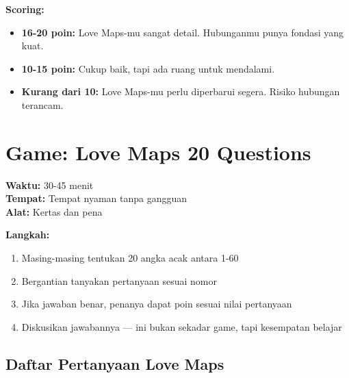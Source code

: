 \begin{exercisebox}
\textbf{Scoring:}
\begin{itemize}
    \item \textbf{16-20 poin:} Love Maps-mu sangat detail. Hubunganmu punya fondasi yang kuat.
    \item \textbf{10-15 poin:} Cukup baik, tapi ada ruang untuk mendalami.
    \item \textbf{Kurang dari 10:} Love Maps-mu perlu diperbarui segera. Risiko hubungan terancam.
\end{itemize}
\end{exercisebox}

\section{Game: Love Maps 20 Questions}

\begin{exercisebox}
\textbf{Waktu:} 30-45 menit\\
\textbf{Tempat:} Tempat nyaman tanpa gangguan\\
\textbf{Alat:} Kertas dan pena

\textbf{Langkah:}
\begin{enumerate}
    \item Masing-masing tentukan 20 angka acak antara 1-60
    \item Bergantian tanyakan pertanyaan sesuai nomor
    \item Jika jawaban benar, penanya dapat poin sesuai nilai pertanyaan
    \item Diskusikan jawabannya --- ini bukan sekadar game, tapi kesempatan belajar
\end{enumerate}
\end{exercisebox}

\subsection{Daftar Pertanyaan Love Maps}

